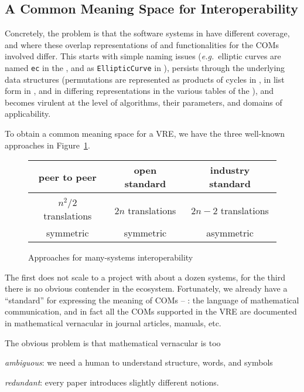 \subsection{A Common Meaning Space for Interoperability}

Concretely, the problem is that the software systems in \ODK have different coverage, and
where these overlap representations of and functionalities for the COMs involved differ.
This starts with simple naming issues (\emph{e.g.}\ elliptic curves are named
\lstinline|ec| in the \LMFDB, and as \lstinline|EllipticCurve| in \Sage), persists through
the underlying data structures (permutations are represented as products of cycles in
\GAP, in list form in \Sage, and in differing representations in the various tables of the
\LMFDB), and becomes virulent at the level of algorithms, their parameters, and domains of
applicability.

To obtain a common meaning space for a VRE, we have the three well-known approaches in
Figure~\ref{fig:interop}.
\begin{figure}[ht]\centering
  \begin{tabular}{|c|c|c|}\hline
    peer to peer & open standard & industry standard\\\hline
     &  & \\\hline
    $n^2/2$  translations & $2n$ translations & $2n-2$ translations \\
    symmetric & symmetric & asymmetric\\\hline
  \end{tabular}
  \caption{Approaches for many-systems interoperability}\label{fig:interop}
\end{figure}

The first does not scale to a project with about a dozen systems, for the third there is
no obvious contender in the \ODK ecosystem. Fortunately, we already have a ``standard'' for
expressing the meaning of COMs -- : the language of
mathematical communication, and in fact all the COMs supported in the \ODK VRE are documented
in mathematical vernacular in journal articles, manuals, etc.

The obvious problem is that mathematical vernacular is too 
\begin{inparaenum}[\em i\rm)]
\item \emph{ambiguous}: we need a human to understand structure, words, and symbols
\item \emph{redundant}: every paper introduces slightly different notions. 
\end{inparaenum}

